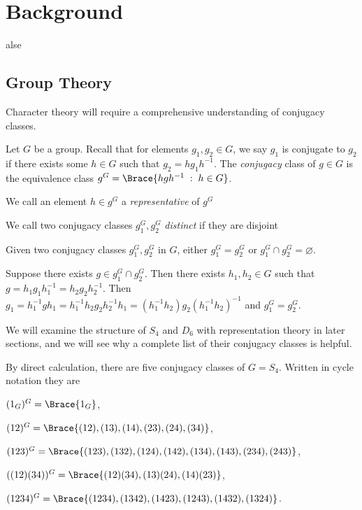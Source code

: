 \documentclass[../Project.tex]{subfiles}
\begin{document}
\newpage
\section{Background}
alse
\subsection{Group Theory}
	Character theory will require a comprehensive understanding of conjugacy classes.
	\begin{defi}
		Let $G$ be a group. Recall that for elements $g_1,g_2 \in G$, we say $g_1$ is conjugate to $g_2$ if there exists some $h \in G$ such that $g_2 = hg_1h^{-1}$. The \textit{conjugacy} class of $g \in G$ is the equivalence class $g^G = \Brace{hgh^{-1} \;:\; h \in G}$.
		\begin{mitem}
		\item We call an element $h \in g^G$ a \textit{representative} of $g^G$
		\item We call two conjugacy classes $g_1^G,g_2^G$ \textit{distinct} if they are disjoint
		\end{mitem}
	\end{defi}
	
	\begin{prop}
		Given two conjugacy classes $g_1^G,g_2^G$ in $G$, either $g_1^G = g_2^G$ or $g_1^G \cap g_2^G = \varnothing$.
	\end{prop}
	\begin{proo*}
		Suppose there exists $g \in g^G_1\cap g^G_2$. Then there exists $h_1,h_2 \in G$ such that $g = h_1g_1h_1^{-1} = h_2g_2h_2^{-1}$. Then $g_1 = h_1^{-1}gh_1 = h_1^{-1}h_2g_2h_2^{-1}h_1 = (h_1^{-1}h_2)g_2(h_1^{-1}h_2)^{-1}$ and $g_1^G = g_2^G$.
	\end{proo*}

	We will examine the structure of $S_4$ and $D_6$ with representation theory in later sections, and we will see why a  complete list of their conjugacy classes is helpful.

	\begin{exam}
		By direct calculation, there are five conjugacy classes of $G = S_4$. Written in cycle notation they are
		\begin{mitem}
			\item $(1_{G})^G = \Brace{1_{G}}$,
			\item $(12)^G = \Brace{(12),(13),(14),(23),(24),(34)}$,
			\item $(123)^G = \Brace{(123),(132),(124),(142),(134),(143),(234),(243)}$,
			\item $((12)(34))^G = \Brace{(12)(34),(13)(24),(14)(23)}$,
			\item $(1234)^G = \Brace{(1234),(1342),(1423),(1243),(1432),(1324)}$.
		\end{mitem}
	\end{exam}
\end{document}

